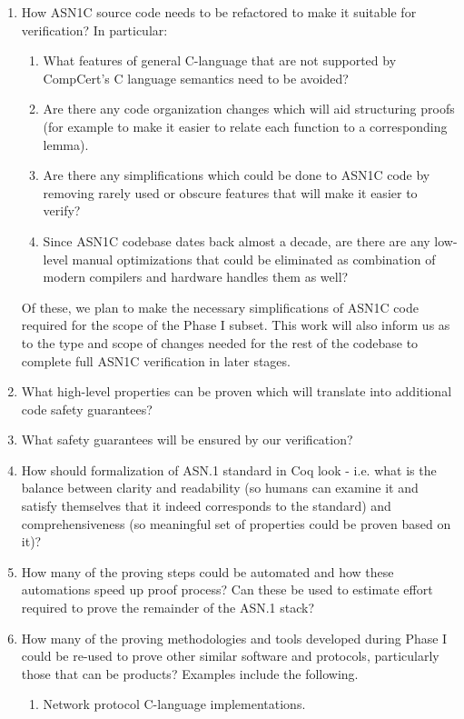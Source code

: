 \documentclass[acmsmall,nonacm]{acmart}
\begin{document}
\begin{enumerate}
\item How ASN1C source code needs to be refactored to make it suitable for verification? In particular:
  \begin{enumerate}
  \item What features of general C-language that are not supported by CompCert's C language semantics need to be avoided?
  \item Are there any code organization changes which will aid structuring proofs (for example to make it easier to relate each function to a corresponding lemma).
  \item Are there any simplifications which could be done to ASN1C code by removing rarely used or obscure features that will make it easier to verify?
  \item Since ASN1C codebase dates back almost a decade, are there are any low-level manual optimizations that could be eliminated as combination of modern compilers and hardware handles them as well?
  \end{enumerate}
  Of these, we plan to make the necessary simplifications of ASN1C
  code required for the scope of the Phase I subset. This work will
  also inform us as to the type and scope of changes needed for the
  rest of the codebase to complete full ASN1C verification in later
  stages.
\item What high-level properties can be proven which will translate into additional code safety guarantees?
\item What safety guarantees will be ensured by our verification?
\item How should formalization of ASN.1 standard in Coq look - i.e. what is the balance between clarity and readability (so humans can examine it and satisfy themselves that it indeed corresponds to the standard) and comprehensiveness (so meaningful set of properties could be proven based on it)?
\item How many of the proving steps could be automated and how these automations speed up proof process? Can these be used to estimate effort required to prove the remainder of the ASN.1 stack?
\item How many of the proving methodologies and tools developed during
  Phase I could be re-used to prove other similar software and
  protocols, particularly those that can be products? Examples include
  the following.
  \begin{enumerate}
    \item Network protocol C-language implementations.

\end{enumerate}
\end{enumerate}
\end{document}
